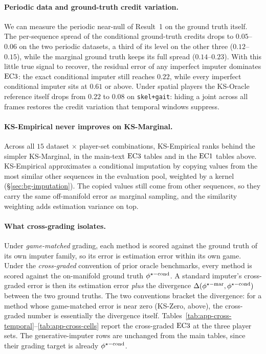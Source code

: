 \paragraph{Periodic data and ground-truth credit variation.}
\label{app:periodic_diag}
We can measure the periodic near-null of Result~1 on the ground truth
itself.  The per-sequence spread of the conditional ground-truth credits
drops to $0.05$--$0.06$ on the two periodic datasets, a third of its level
on the other three ($0.12$--$0.15$), while the marginal ground truth keeps
its full spread ($0.14$--$0.23$).  With this little true signal to recover,
the residual error of any imperfect imputer dominates $\mathrm{EC3}$: the exact
conditional imputer still reaches $0.22$, while every imperfect conditional
imputer sits at $0.61$ or above.  Under spatial players the KS-Oracle
reference itself drops from $0.22$ to $0.08$ on \texttt{skel+gait}: hiding
a joint across all frames restores the credit variation that temporal
windows suppress.

\paragraph{KS-Empirical never improves on KS-Marginal.}
\label{app:empirical}
Across all $15$ dataset $\times$ player-set combinations, KS-Empirical
ranks behind the simpler KS-Marginal, in the main-text $\mathrm{EC3}$ tables
and in the $\mathrm{EC1}$ tables above.  KS-Empirical approximates a conditional
imputation by copying values from the most similar other sequences in the
evaluation pool, weighted by a kernel (\S\ref{sec:bg-imputation}).  The
copied values still come from other sequences, so they carry the same
off-manifold error as marginal sampling, and the similarity weighting adds
estimation variance on top.

\paragraph{What cross-grading isolates.}
Under \emph{game-matched} grading, each method is scored against the ground
truth of its own imputer family, so its error is estimation error within its
own game.  Under the \emph{cross-graded} convention of prior oracle
benchmarks, every method is scored against the on-manifold ground truth
$\phi^{\star\mathrm{-cond}}$.  A standard imputer's cross-graded error is then its
estimation error \emph{plus} the divergence $\Delta(\phi^{\star\mathrm{-mar}}, \phi^{\star\mathrm{-cond}})$ between
the two ground truths.  The two conventions bracket the divergence: for a
method whose game-matched error is near zero (KS-Zero, above), the
cross-graded number is essentially the divergence itself.
Tables~\ref{tab:app-cross-temporal}--\ref{tab:app-cross-cells} report the
cross-graded $\mathrm{EC3}$ at the three player sets.  The generative-imputer rows
are unchanged from the main tables, since their grading target is already
$\phi^{\star\mathrm{-cond}}$.

